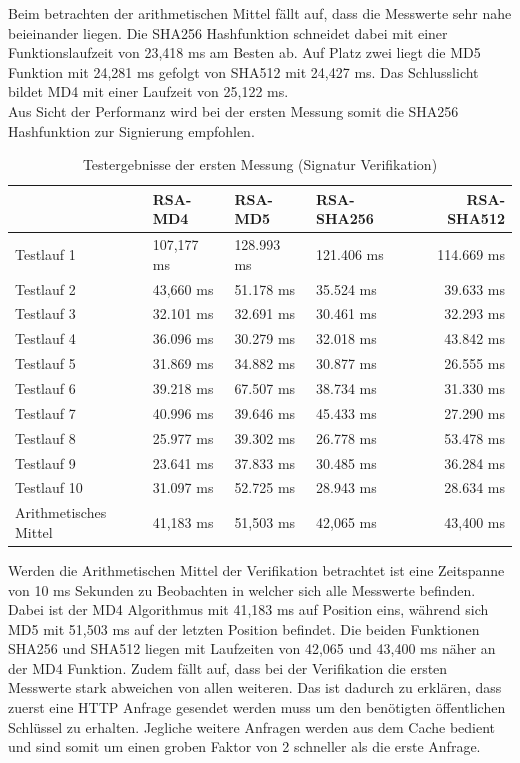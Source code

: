 Beim betrachten der arithmetischen Mittel fällt auf, dass die Messwerte sehr nahe beieinander liegen. Die SHA256 Hashfunktion schneidet dabei mit einer Funktionslaufzeit von 23,418 ms am Besten ab. Auf Platz zwei liegt die MD5 Funktion mit 24,281 ms gefolgt von SHA512 mit 24,427 ms. Das Schlusslicht bildet MD4 mit einer Laufzeit von 25,122 ms.\\
Aus Sicht der Performanz wird bei der ersten Messung somit die SHA256 Hashfunktion zur Signierung empfohlen.
\begin{table}[h]
	\begin{tabularx}{\textwidth}{p{}|X|X|X|r}
		& RSA-MD4 & RSA-MD5 & RSA-SHA256 & RSA-SHA512\\
		\hline
		Testlauf 1& 107,177 ms& 128.993 ms& 121.406 ms& 114.669 ms\\
		Testlauf 2& 43,660 ms& 51.178 ms& 35.524 ms& 39.633 ms\\
		Testlauf 3& 32.101 ms& 32.691 ms& 30.461 ms& 32.293 ms\\
		Testlauf 4& 36.096 ms& 30.279 ms& 32.018 ms& 43.842 ms\\
		Testlauf 5& 31.869 ms& 34.882 ms& 30.877 ms& 26.555 ms\\
		Testlauf 6& 39.218 ms& 67.507 ms& 38.734 ms& 31.330 ms\\
		Testlauf 7& 40.996 ms& 39.646 ms& 45.433 ms& 27.290 ms\\
		Testlauf 8& 25.977 ms& 39.302 ms& 26.778 ms& 53.478 ms\\
		Testlauf 9& 23.641 ms& 37.833 ms& 30.485 ms& 36.284 ms\\
		Testlauf 10& 31.097 ms& 52.725 ms& 28.943 ms& 28.634 ms\\
		\hline
		Arithmetisches Mittel& 41,183 ms& 51,503 ms& 42,065 ms& 43,400 ms
	\end{tabularx}
	\caption{Testergebnisse der ersten Messung (Signatur Verifikation)}
\end{table}
Werden die Arithmetischen Mittel der Verifikation betrachtet ist eine Zeitspanne von 10 ms Sekunden zu Beobachten in welcher sich alle Messwerte befinden. Dabei ist der MD4 Algorithmus mit 41,183 ms auf Position eins, während sich MD5 mit 51,503 ms auf der letzten Position befindet. Die beiden Funktionen SHA256 und SHA512 liegen mit Laufzeiten von 42,065 und 43,400 ms näher an der MD4 Funktion. Zudem fällt auf, dass bei der Verifikation die ersten Messwerte stark abweichen von allen weiteren. Das ist dadurch zu erklären, dass zuerst eine HTTP Anfrage gesendet werden muss um den benötigten öffentlichen Schlüssel zu erhalten. Jegliche weitere Anfragen werden aus dem Cache bedient und sind somit um einen groben Faktor von 2 schneller als die erste Anfrage.\\
